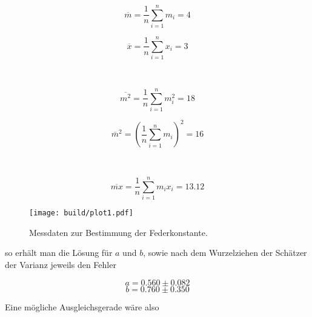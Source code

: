 \begin{minipage}{0.4\textwidth}
\begin{equation}
\overline{m} = \frac{1}{n} \sum_{i=1}^n m_i = 4
\end{equation}
\end{minipage}
\begin{minipage}{0.4\textwidth}
\begin{equation}
\overline{x} = \frac{1}{n} \sum_{i=1}^n x_i = 3
\end{equation}
\end{minipage}
\begin{flushleft}
~
\end{flushleft}
\begin{minipage}{0.45\textwidth}
\begin{equation}
\overline{m^2} = \frac{1}{n} \sum_{i=1}^n m_i^2 = 18
\end{equation}
\end{minipage}
\begin{minipage}{0.45\textwidth}
\begin{equation}
\overline{m}^2 = \left( \frac{1}{n} \sum_{i=1}^n m_i \right)^2 = 16
\end{equation}
\end{minipage}
\begin{flushleft}
~
\end{flushleft}
\begin{minipage}{1\textwidth}
\centering
\begin{equation}
\overline{mx} = \frac{1}{n} \sum_{i=1}^n m_i x_i = 13.12
\end{equation}
\end{minipage}
\begin{figure}[t]
  \centering
  \texttt{[image: build/plot1.pdf]}
  \caption{Messdaten zur Bestimmung der Federkonstante.}
  \label{fig:plot1}
\end{figure}
\begin{flushleft}
so erhält man die Lösung für $a$ und $b$, sowie nach dem Wurzelziehen der Schätzer der Varianz jeweils den Fehler
\end{flushleft}
\begin{equation}
a = 0.560 \pm 0.082
\end{equation}
\begin{equation}
b = 0.760 \pm 0.350
\end{equation}
\begin{flushleft}
Eine mögliche Ausgleichsgerade wäre also
\end{flushleft}

